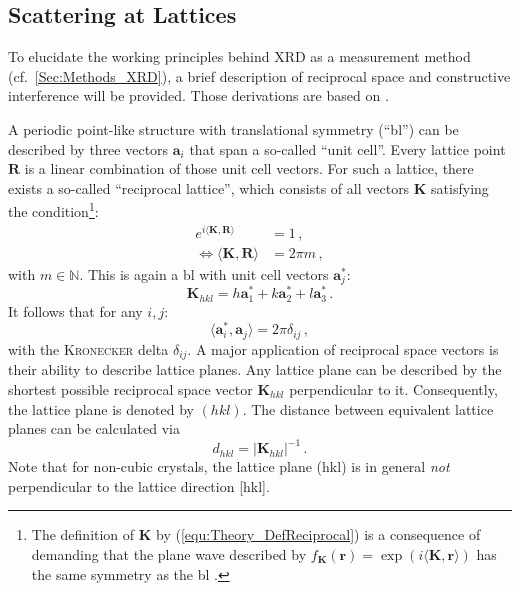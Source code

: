\subsection{Scattering at Lattices}
To elucidate the working principles behind \gls{XRD} as a measurement method (cf.~\ref{Sec:Methods_XRD}), a brief description of reciprocal space and constructive interference will be provided.
Those derivations are based on \textcite{ashcroft1976}.

A periodic point-like structure with translational symmetry (\enquote{\gls{bl}}) can be described by three vectors $\mathbf{a}_i$ that span a so-called \enquote{unit cell}.
Every lattice point $\mathbf{R}$ is a linear combination of those unit cell vectors.
For such a lattice, there exists a so-called \enquote{reciprocal lattice}, which consists of all vectors $\mathbf{K}$ satisfying the condition\footnote{
    The definition of $\textbf{K}$ by (\ref{equ:Theory_DefReciprocal}) is a consequence of demanding that the plane wave described by $f_\mathbf{K}(\mathbf{r})=\exp(i\langle\mathbf{K},\mathbf{r}\rangle)$ has the same symmetry as the \gls{bl}
        \cite{ashcroft1976}.
}:
\begin{align}
    e^{i\langle\mathbf{K},\mathbf{R}\rangle}&=1\,,
    \label{equ:Theory_DefReciprocal}\\
    \Leftrightarrow\langle\mathbf{K},\mathbf{R}\rangle&=2\pi m\,,
    \label{Equ:Theory_DefReciprocal2}
\end{align}
with $m\in\mathbb{N}$.
This is again a \gls{bl} with unit cell vectors $\mathbf{a}_j^*$:
\begin{equation}
    \mathbf{K}_{hkl}=h\mathbf{a}_1^*+k\mathbf{a}_2^*+l\mathbf{a}_3^*\,.
\end{equation}
It follows that for any $i,j$:
\begin{equation}
    \langle\mathbf{a}_i^*,\mathbf{a}_j\rangle=2\pi\delta_{ij}\,,
\end{equation}
with the \textsc{Kronecker} delta $\delta_{ij}$.
A major application of reciprocal space vectors is their ability to describe lattice planes.
Any lattice plane can be described by the shortest possible reciprocal space vector $\mathbf{K}_{hkl}$ perpendicular to it.
Consequently, the lattice plane is denoted by $(hkl)$.
The distance between equivalent lattice planes can be calculated via
\begin{equation}\label{Equ:Theory_planeDistance}
    d_{hkl}=|\mathbf{K}_{hkl}|^{-1}\,.
\end{equation}
Note that for non-cubic crystals, the lattice plane (hkl) is in general \textit{not} perpendicular to the lattice direction [hkl].

